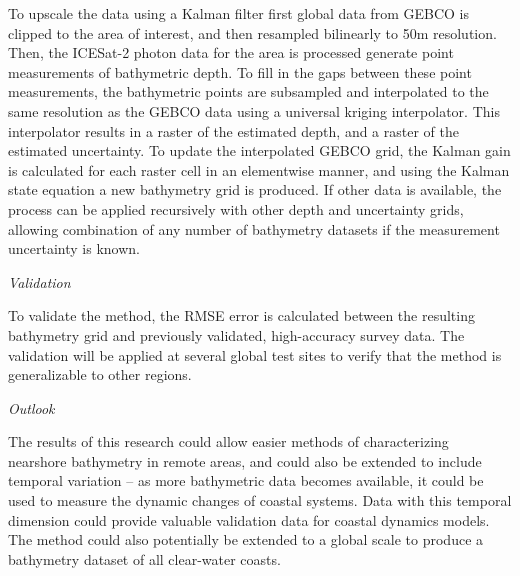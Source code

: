 To upscale the data using a Kalman filter first global data from GEBCO is clipped to the area of interest, and then resampled bilinearly to 50m resolution. Then, the ICESat-2 photon data for the area is processed generate point measurements of bathymetric depth. To fill in the gaps between these point measurements, the bathymetric points are subsampled and interpolated to the same resolution as the GEBCO data using a universal kriging interpolator. This interpolator results in a raster of the estimated depth, and a raster of the estimated uncertainty. To update the interpolated GEBCO grid, the Kalman gain is calculated for each raster cell in an elementwise manner, and using the Kalman state equation a new bathymetry grid is produced. If other data is available, the process can be applied recursively with other depth and uncertainty grids, allowing combination of any number of bathymetry datasets if the measurement uncertainty is known. 

\noindent\emph{Validation}

To validate the method, the RMSE error is calculated between the resulting bathymetry grid and previously validated, high-accuracy survey data. The validation will be applied at several global test sites to verify that the method is generalizable to other regions.

\noindent\emph{Outlook} 

The results of this research could allow easier methods of characterizing nearshore bathymetry in remote areas, and could also be extended to include temporal variation – as more bathymetric data becomes available, it could be used to measure the dynamic changes of coastal systems. Data with this temporal dimension could provide valuable validation data for coastal dynamics models. The method could also potentially be extended to a global scale to produce a bathymetry dataset of all clear-water coasts.
